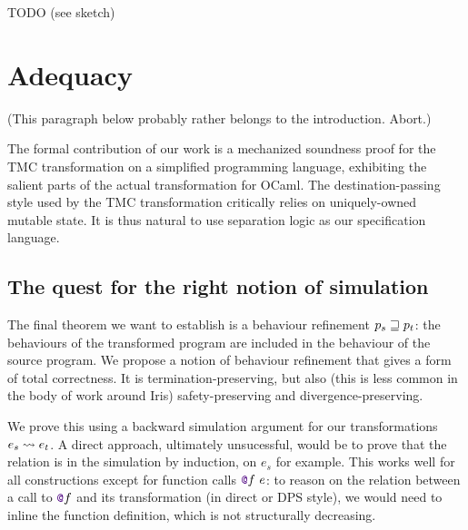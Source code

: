 TODO (see sketch)

\section{Adequacy}
\label{sec:soundness}
\label{sec:adequacy}

(This paragraph below probably rather belongs to the introduction. Abort.)

The formal contribution of our work is a mechanized soundness proof for the TMC transformation on a simplified programming language, exhibiting the salient parts of the actual transformation for OCaml.
%
The destination-passing style used by the TMC transformation critically relies on uniquely-owned mutable state.
%
It is thus natural to use separation logic as our specification language.

\subsection{The quest for the right notion of simulation}
\label{sec:howto-relation}

The final theorem we want to establish is a behaviour refinement $p_s \sqsupseteq p_t$: the behaviours of the transformed program are included in the behaviour of the source program.
%
We propose a notion of behaviour refinement that gives a form of total correctness.
%
It is termination-preserving, but also (this is less common in the body of work around Iris) safety-preserving and divergence-preserving.

We prove this using a backward simulation argument for our transformations $e_s \rightsquigarrow e_t$.
%
A direct approach, ultimately unsucessful, would be to prove that the relation is in the simulation by induction, on $e_s$ for example.
%
This works well for all constructions except for function calls $\lambdCall{\lambdFunc{f}}{e}$: to reason on the relation between a call to $\lambdFunc{f}$ and its transformation (in direct or DPS style), we would need to inline the function definition, which is not structurally decreasing.

